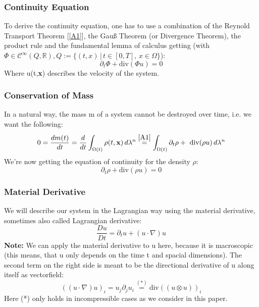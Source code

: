 \documentclass[12pt,a4paper]{report}
\begin{document}
\subsubsection{Continuity Equation}
To derive the continuity equation, one has to use a combination of the Reynold Transport Theorem [\ref{A1}], the Gauß Theorem (or Divergence Theorem), the product rule and the fundamental lemma of calculus getting (with \(\Phi \in \mathcal{C}^{\infty}(Q,\mathbb{R}), Q:=\{(t,x)\, | \, t \in [0,T],\, x \in \Omega\}\)):
\begin{equation}
    \partial_t \Phi + \text{div}(\Phi u) = 0
\end{equation}
Where u(t,\textbf{x}) describes the velocity of the system.
\subsubsection{Conservation of Mass}
In a natural way, the mass m of a system cannot be destroyed over time, i.e. we want the following:\\
\begin{equation}
    0 = \frac{dm(t)}{dt} = \frac{d}{dt} \int_{\Omega(t)} \rho (t,\textbf{x}) \, d\lambda^n \stackrel{\ref{A1}}{=} \int_{\Omega(t)} \partial_t \rho + \text{ div}(\rho u) \, d\lambda^n
\end{equation}
We're now getting the equation of continuity for the density \(\rho\):
\begin{equation}
    \partial_t \rho + \text{div}(\rho u) = 0
\end{equation}
\subsubsection{Material Derivative}
We will describe our system in the Lagrangian way using the material derivative, sometimes also called Lagrangian derivative:
\begin{equation}
    \frac{Du}{Dt} = \partial_t u + (u \cdot \nabla)u
\end{equation}
\textbf{Note:} We can apply the material derivative to u here, because it is macroscopic (this means, that u only depends on the time t and spacial dimensions). The second term on the right side is meant to be the directional derivative of u along itself as vectorfield:
\begin{equation}
    ((u \cdot \nabla)u)_i = u_j\partial_j u_i \stackrel{(*)}{=} \text{div}((u\otimes u))_i
\end{equation}
Here (*) only holds in incompressible cases as we consider in this paper.
\end{document}
